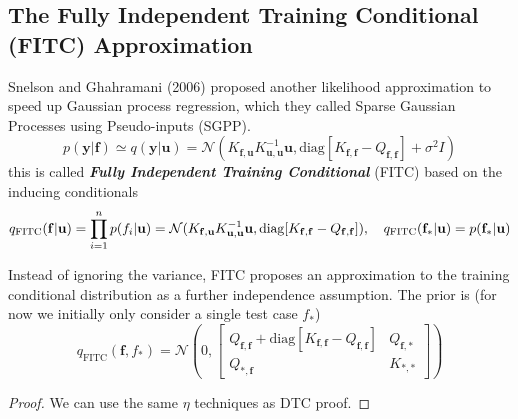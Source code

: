 \documentclass[10pt]{elegantbook}
\newcommand{\mydefination}[1]{\textbf{\textit{\textcolor{structurecolor}{#1}}}}
\begin{document}
\subsection{The Fully Independent Training Conditional (FITC) Approximation}
Snelson and Ghahramani (2006) proposed another likelihood approximation to speed up
Gaussian process regression, which they called Sparse Gaussian Processes using Pseudo-inputs
(SGPP).
\begin{equation}
    p(\mathbf y | \mathbf f) \simeq q(\mathbf y | \mathbf u) = \mathcal N \left ( 
        K_{\mathbf f, \mathbf u} K_{\mathbf u, \mathbf u}^{-1} \mathbf u, 
        \mathrm{diag} [K_{\mathbf f, \mathbf f} - Q_{\mathbf f, \mathbf f}] + \sigma^2 I
         \right )
\end{equation}
this is called \mydefination{Fully Independent Training Conditional} (FITC) based on the inducing conditionals
\begin{equation}
    q_{\mathrm{FITC}}(\mathbf{f|u})
    = \prod_{i=1}^{n} p(f_i | \mathbf u)
    =\mathcal{N}(K_{\mathbf{f,u}}K_{\mathbf{u,u}}^{-1}{\bf u}, \mathrm{diag} [K_{\mathbf f, \mathbf f} - Q_{\mathbf f, \mathbf f}]),
    \quad q_{\mathrm{FITC}}(\mathbf{f_{*}}|{\bf u})=p(\mathbf{f_{*}}|{\bf u})
\end{equation}

Instead of ignoring the variance, FITC proposes an approximation to the training conditional
distribution as a further independence assumption. The prior is (for now we initially only consider a single test case $f_*$)
\begin{equation}
    q_{\text{FITC}}(\mathbf f, f_*) = \mathcal N \left ( 0, \begin{bmatrix}
        Q_{\mathbf f, \mathbf f} + \mathrm{diag} [K_{\mathbf f, \mathbf f} - Q_{\mathbf f, \mathbf f}] & Q_{\mathbf f, *} \\
        Q_{*, \mathbf f} & K_{*, *}
    \end{bmatrix} \right )
\end{equation}

\begin{proof}
    We can use the same $\eta$ techniques as DTC proof.
\end{proof}
\end{document}
